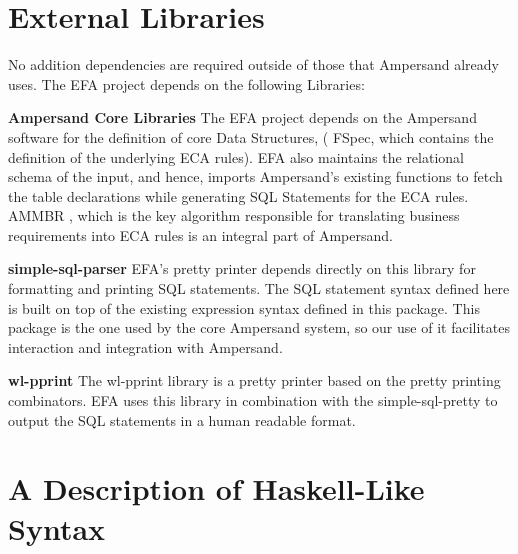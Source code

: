 \section{External Libraries}
\noindent No addition dependencies are required outside of those that Ampersand 
already 
uses. The EFA project depends on the following Libraries:
\begin{description}
    \item \textbf{Ampersand Core Libraries} \newline
    The EFA project depends on the Ampersand software for the definition of 
    core Data Structures, ( FSpec, which contains the definition of 
    the underlying ECA rules). EFA also maintains the relational schema of 
    the input, and hence, imports Ampersand's existing functions to fetch 
    the table declarations while generating SQL Statements for the ECA 
    rules. AMMBR \cite{AMMBR}, which is the key algorithm responsible for 
    translating business requirements into ECA rules is an integral part of 
    Ampersand.
    \item \textbf{simple-sql-parser} \newline
    EFA's pretty printer depends directly on this library for formatting 
    and printing SQL statements. The SQL statement syntax 
    defined here is built on top of the existing expression syntax defined 
    in this package. This package is the one used by the core Ampersand system,
    so our use of it facilitates interaction and integration with Ampersand. 
    \cite{simple-sql}
    \item \textbf{wl-pprint} \newline 
    The wl-pprint library\cite{wl-pprint} is a pretty printer based on the
    pretty printing combinators. EFA uses this library in combination with
    the simple-sql-pretty to output the SQL statements in a human readable
    format.
    \item 
\end{description}

\noindent
\section{A Description of Haskell-Like Syntax}\label{subsec:HaskellSyntax}

